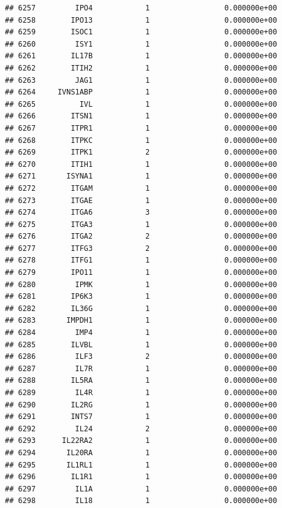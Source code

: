 \documentclass[
]{article}
\begin{document}
\begin{verbatim}
## 6257         IPO4            1                 0.000000e+00
## 6258        IPO13            1                 0.000000e+00
## 6259        ISOC1            1                 0.000000e+00
## 6260         ISY1            1                 0.000000e+00
## 6261        IL17B            1                 0.000000e+00
## 6262        ITIH2            1                 0.000000e+00
## 6263         JAG1            1                 0.000000e+00
## 6264     IVNS1ABP            1                 0.000000e+00
## 6265          IVL            1                 0.000000e+00
## 6266        ITSN1            1                 0.000000e+00
## 6267        ITPR1            1                 0.000000e+00
## 6268        ITPKC            1                 0.000000e+00
## 6269        ITPK1            2                 0.000000e+00
## 6270        ITIH1            1                 0.000000e+00
## 6271       ISYNA1            1                 0.000000e+00
## 6272        ITGAM            1                 0.000000e+00
## 6273        ITGAE            1                 0.000000e+00
## 6274        ITGA6            3                 0.000000e+00
## 6275        ITGA3            1                 0.000000e+00
## 6276        ITGA2            2                 0.000000e+00
## 6277        ITFG3            2                 0.000000e+00
## 6278        ITFG1            1                 0.000000e+00
## 6279        IPO11            1                 0.000000e+00
## 6280         IPMK            1                 0.000000e+00
## 6281        IP6K3            1                 0.000000e+00
## 6282        IL36G            1                 0.000000e+00
## 6283       IMPDH1            1                 0.000000e+00
## 6284         IMP4            1                 0.000000e+00
## 6285        ILVBL            1                 0.000000e+00
## 6286         ILF3            2                 0.000000e+00
## 6287         IL7R            1                 0.000000e+00
## 6288        IL5RA            1                 0.000000e+00
## 6289         IL4R            1                 0.000000e+00
## 6290        IL2RG            1                 0.000000e+00
## 6291        INTS7            1                 0.000000e+00
## 6292         IL24            2                 0.000000e+00
## 6293      IL22RA2            1                 0.000000e+00
## 6294       IL20RA            1                 0.000000e+00
## 6295       IL1RL1            1                 0.000000e+00
## 6296        IL1R1            1                 0.000000e+00
## 6297         IL1A            1                 0.000000e+00
## 6298         IL18            1                 0.000000e+00

\end{verbatim}
\end{document}
